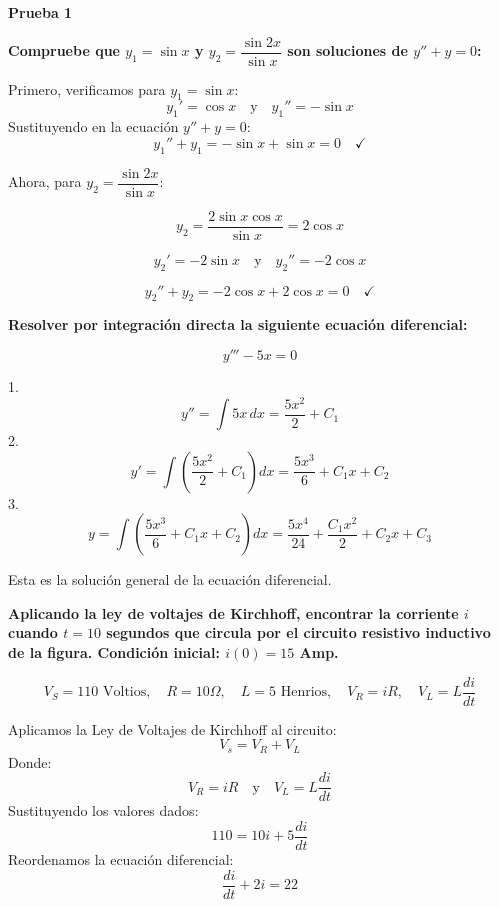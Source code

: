\documentclass[answers]{exam}
\begin{document}
\begin{center}
	\large\textbf{Prueba 1}
\end{center}

\begin{questions}

	\question \large\textbf{Compruebe que $y_1 = \sin x$ y $y_2=\dfrac{\sin 2x}{\sin x}$ son soluciones de $y''+y=0$:}

	Primero, verificamos para $y_1 = \sin x$:
	\[
		y_1' = \cos x \quad \text{y} \quad y_1'' = -\sin x
	\]
	Sustituyendo en la ecuación $y'' + y = 0$:
	\[
		y_1'' + y_1 = -\sin x + \sin x = 0 \quad \checkmark
	\]

	Ahora, para $y_2 = \dfrac{\sin 2x}{\sin x}$:

	\[
		y_2 = \frac{2\sin x \cos x}{\sin x} = 2\cos x
	\]

	\[
		y_2' = -2\sin x \quad \text{y} \quad y_2'' = -2\cos x
	\]

	\[
		y_2'' + y_2 = -2\cos x + 2\cos x = 0 \quad \checkmark
	\]

	\vspace{0.5cm}


	\question \large\textbf{Resolver por integración directa la siguiente ecuación diferencial:}

	\[y''' - 5x = 0\]



	1.  \[y'' = \int 5x \, dx = \dfrac{5x^2}{2} + C_1\]
	2.  \[y' = \int \left(\dfrac{5x^2}{2} + C_1\right) dx = \dfrac{5x^3}{6} + C_1x + C_2\]
	3. 	 \[y = \int \left(\dfrac{5x^3}{6} + C_1x + C_2\right) dx = \dfrac{5x^4}{24} + \dfrac{C_1x^2}{2} + C_2x + C_3\]

	Esta es la solución general de la ecuación diferencial.

	\vspace{0.5cm}

	\newpage
	\question \large\textbf{Aplicando la ley de voltajes de Kirchhoff, encontrar la corriente $i$ cuando $t=10$ segundos que circula por el circuito resistivo inductivo de la figura. Condición inicial: $i(0)=15$ Amp.}

	\[
		V_S = 110 \text{ Voltios}, \quad
		R = 10 \Omega, \quad
		L = 5 \text{ Henrios}, \quad
		V_R = iR, \quad
		V_L = L\dfrac{di}{dt}
	\]


	Aplicamos la Ley de Voltajes de Kirchhoff al circuito:
	\[
		V_s = V_R + V_L
	\]
	Donde:
	\[
		V_R = iR \quad \text{y} \quad V_L = L \frac{di}{dt}
	\]
	Sustituyendo los valores dados:
	\[
		110 = 10i + 5\frac{di}{dt}
	\]
	Reordenamos la ecuación diferencial:
	\[
		\frac{di}{dt} + 2i = 22
	\]


\end{questions}
\end{document}
